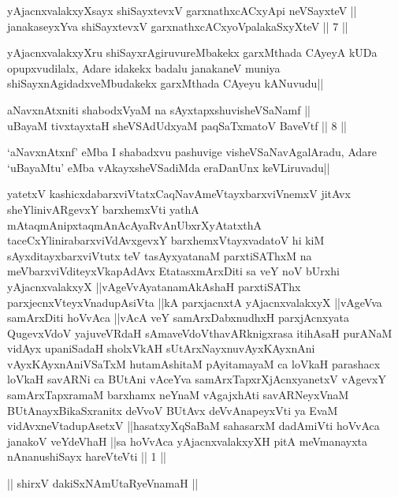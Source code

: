 
\begin{shl}
yAjacnxvalakxyXsayx shiSayxtevxV garxnathxcACxyA\s pi neVSayxteV || \\
janakaseyxYva shiSayxtevxV garxnathxcACxyoVpalakaSxyXteV ||  7 ||  
\end{shl}

\begin{artha}
yAjacnxvalakxyXru shiSayxrAgiruvureMbakekx garxMthada CAyeyA kUDa opupxvudilalx, Adare idakekx badalu janakaneV muniya shiSayxnAgidadxveMbudakekx garxMthada CAyeyu kANuvudu||
\end{artha}


\begin{shl}
aNavxnAtxniti shabodxV\s yaM na sAyxtapxshuvisheVSaNamf || \\
uBayaM tivxtayxtaH sheVSAdUdxyaM paqSaTxmatoV BaveVtf ||  8 ||  
\end{shl}

\begin{artha}
`aNavxnAtxnf' eMba I shabadxvu pashuvige visheVSaNavAgalAradu, Adare `uBayaMtu' eMba vAkayxsheVSadiMda eraDanUnx keVLiruvadu||
\end{artha}

\begin{shl}
yatetxV kashicxdabarxviVtatxCaqNavAmeVtayxbarxviVnemxV jitAvx sheYlinivARgevxY barxhemxVti yathA mAtaqmAnipxtaqmAnAcAyaRvAnUbxrXyAtatxthA taceCxYlinirabarxviVdAvxgevxY barxhemxVtayxvadatoV hi kiM sAyxditayxbarxviVtutx teV tasAyxyatanaM parxtiSAThxM na meV\s barxviVditeyxVkapAdAvx EtatasxmArxDiti sa veY noV bUrxhi yAjacnxvalakxyX ||vAgeVvAyatanamAkAshaH parxtiSAThx parxjecnxVteyxVnadupAsiVta ||kA parxjacnxtA yAjacnxvalakxyX ||vAgeVva samArxDiti hoVvAca ||vAcA veY samArxDabxnudhxH parxjAcnxyata QugevxVdoV yajuveVRdaH sAmaveVdoV\s thavARknigxrasa itihAsaH purANaM vidAyx upaniSadaH sholxVkAH sUtArxNayxnuvAyxKAyxnAni vAyxKAyxnAniVSaTxM hutamAshitaM pAyitamayaM ca loVkaH parashacx loVkaH savARNi ca BUtAni vAceYva samArxTapxrXjAcnxyanetxV vAgevxY samArxTapxramaM barxhamx neYnaM vAgajxhAti savARNeyxVnaM BUtAnayxBikaSxranitx deVvoV BUtAvx deVvAnapeyxVti ya EvaM vidAvxneVtadupAsetxV ||hasatxyXqSaBaM sahasarxM dadAmiVti hoVvAca janakoV veYdeVhaH ||sa hoVvAca yAjacnxvalakxyXH pitA meV\s manayxta nAnanushiSayx hareVteVti || 1 ||
\end{shl}

\begin{center}%
|| shirxV dakiSxNAmUtaRyeVnamaH ||
\end{center}
